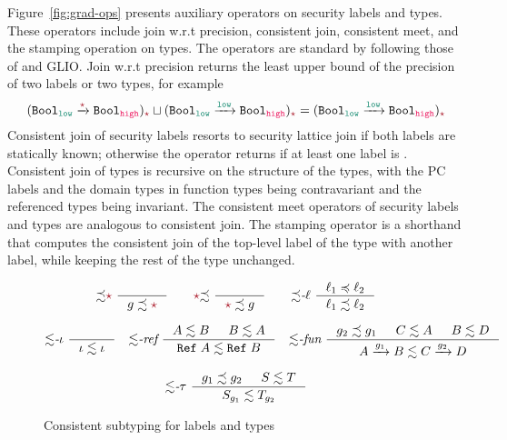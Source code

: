 Figure~\ref{fig:grad-ops} presents auxiliary operators on security labels and
types. These operators include join w.r.t precision, consistent join, consistent
meet, and the stamping operation on types. The operators are standard by following
those of \GSLRef and GLIO. Join w.r.t precision returns the least upper bound of
the precision of two labels or two types, for example
\[
(\Fun{\Bool_{\low}}{\unk}{\Bool_{\high}})_{\unk} \sqcup
(\Fun{\Bool_{\low}}{\low}{\Bool_{\high}})_{\unk} =
(\Fun{\Bool_{\low}}{\low}{\Bool_{\high}})_{\unk}
\]
Consistent join of security labels resorts to security lattice join if both
labels are statically known; otherwise the operator returns \unk if at least one
label is \unk. Consistent join of types is recursive on the structure of the
types, with the PC labels and the domain types in function types being
contravariant and the referenced types being invariant. The consistent meet
operators of security labels and types are analogous to consistent join. The
stamping operator is a shorthand that computes the consistent join of the
top-level label of the type with another label, while keeping the rest of the
type unchanged.

\begin{figure}[tbp]
  \raggedright
  \begin{gather*}
    {\precsim}\unk~
    \inference{}{g \precsim \unk}
    \qquad
    \unk{\precsim}~
    \inference{}{\unk \precsim g}
    \qquad
        {\precsim}\textit{-}\ell~
        \inference{\ell_1 \preccurlyeq \ell_2}{\ell_1 \precsim \ell_2}
  \end{gather*}
  \raggedright
  \begin{gather*}
          {\lesssim}\textit{-}\iota~
          \inference{}{\iota \lesssim \iota}
          \quad
              {\lesssim}\textit{-ref}~
              \inference{A \lesssim B & B \lesssim A}{\Refer{A} \lesssim \Refer{B}} \quad
                        {\lesssim}\textit{-fun}~
                        \inference{g_2 \precsim g_1 & C \lesssim A & B \lesssim D}
                                  {\Fun{A}{g_1}{B} \lesssim \Fun{C}{g_2}{D}}
  \end{gather*}
  \raggedright
  \begin{gather*}
    {\lesssim}\textit{-}\tau~
    \inference{g_1 \precsim g_2 & S \lesssim T}{S_{g_1} \lesssim T_{g_2}}
  \end{gather*}
  \caption{Consistent subtyping for labels and types}
  \label{fig:consis-sub}
\end{figure}

